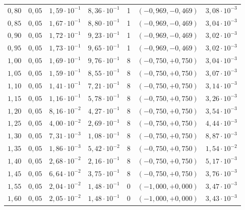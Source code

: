\begin{tabular}{ccccccc}
$0{,}80$ & $0{,}05$ & $1{,}59 \cdot 10^{-1}$ & $8{,}36 \cdot 10^{-1}$ & 1 & $(-0{,}969, -0{,}469)$ & $3{,}08 \cdot 10^{-3}$ \\
$0{,}85$ & $0{,}05$ & $1{,}67 \cdot 10^{-1}$ & $8{,}80 \cdot 10^{-1}$ & 1 & $(-0{,}969, -0{,}469)$ & $3{,}04 \cdot 10^{-3}$ \\
$0{,}90$ & $0{,}05$ & $1{,}72 \cdot 10^{-1}$ & $9{,}23 \cdot 10^{-1}$ & 1 & $(-0{,}969, -0{,}469)$ & $3{,}02 \cdot 10^{-3}$ \\
$0{,}95$ & $0{,}05$ & $1{,}73 \cdot 10^{-1}$ & $9{,}65 \cdot 10^{-1}$ & 1 & $(-0{,}969, -0{,}469)$ & $3{,}02 \cdot 10^{-3}$ \\
$1{,}00$ & $0{,}05$ & $1{,}69 \cdot 10^{-1}$ & $9{,}76 \cdot 10^{-1}$ & 8 & $(-0{,}750, +0{,}750)$ & $3{,}04 \cdot 10^{-3}$ \\
$1{,}05$ & $0{,}05$ & $1{,}59 \cdot 10^{-1}$ & $8{,}55 \cdot 10^{-1}$ & 8 & $(-0{,}750, +0{,}750)$ & $3{,}07 \cdot 10^{-3}$ \\
$1{,}10$ & $0{,}05$ & $1{,}41 \cdot 10^{-1}$ & $7{,}21 \cdot 10^{-1}$ & 8 & $(-0{,}750, +0{,}750)$ & $3{,}14 \cdot 10^{-3}$ \\
$1{,}15$ & $0{,}05$ & $1{,}16 \cdot 10^{-1}$ & $5{,}78 \cdot 10^{-1}$ & 8 & $(-0{,}750, +0{,}750)$ & $3{,}26 \cdot 10^{-3}$ \\
$1{,}20$ & $0{,}05$ & $8{,}16 \cdot 10^{-2}$ & $4{,}27 \cdot 10^{-1}$ & 8 & $(-0{,}750, +0{,}750)$ & $3{,}54 \cdot 10^{-3}$ \\
$1{,}25$ & $0{,}05$ & $4{,}00 \cdot 10^{-2}$ & $2{,}69 \cdot 10^{-1}$ & 8 & $(-0{,}750, +0{,}750)$ & $4{,}44 \cdot 10^{-3}$ \\
$1{,}30$ & $0{,}05$ & $7{,}31 \cdot 10^{-3}$ & $1{,}08 \cdot 10^{-1}$ & 8 & $(-0{,}750, +0{,}750)$ & $8{,}87 \cdot 10^{-3}$ \\
$1{,}35$ & $0{,}05$ & $1{,}86 \cdot 10^{-3}$ & $5{,}42 \cdot 10^{-2}$ & 8 & $(-0{,}750, +0{,}750)$ & $1{,}54 \cdot 10^{-2}$ \\
$1{,}40$ & $0{,}05$ & $2{,}68 \cdot 10^{-2}$ & $2{,}16 \cdot 10^{-1}$ & 8 & $(-0{,}750, +0{,}750)$ & $5{,}17 \cdot 10^{-3}$ \\
$1{,}45$ & $0{,}05$ & $6{,}64 \cdot 10^{-2}$ & $3{,}75 \cdot 10^{-1}$ & 8 & $(-0{,}750, +0{,}750)$ & $3{,}76 \cdot 10^{-3}$ \\
$1{,}55$ & $0{,}05$ & $2{,}04 \cdot 10^{-2}$ & $1{,}48 \cdot 10^{-1}$ & 0 & $(-1{,}000, +0{,}000)$ & $3{,}47 \cdot 10^{-3}$ \\
$1{,}60$ & $0{,}05$ & $2{,}05 \cdot 10^{-2}$ & $1{,}48 \cdot 10^{-1}$ & 0 & $(-1{,}000, +0{,}000)$ & $3{,}43 \cdot 10^{-3}$ \\

\end{tabular}
